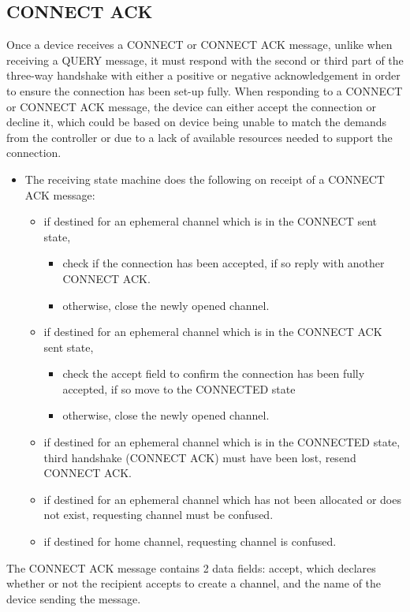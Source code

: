 \subsection{CONNECT ACK} %
\label{sub:connect_ack}
Once a device receives a CONNECT or CONNECT ACK message, unlike when receiving a QUERY message, it must respond with the second or third part of the three-way handshake with either a positive or negative acknowledgement in order to ensure the connection has been set-up fully. When responding to a CONNECT or CONNECT ACK message, the device can either accept the connection or decline it, which could be based on device being unable to match the demands from the controller or due to a lack of available resources needed to support the connection.

\begin{itemize}
	\item []The receiving state machine does the following on receipt of a CONNECT ACK message:
	\begin{itemize}
		\item if destined for an ephemeral channel which is in the CONNECT sent state,
		\begin{itemize}
		 	\item check if the connection has been accepted, if so reply with another CONNECT ACK.
		 	\item otherwise, close the newly opened channel.
		\end{itemize} 
		\item if destined for an ephemeral channel which is in the CONNECT ACK sent state,
		\begin{itemize}
		  	\item check the accept field to confirm the connection has been fully accepted, if so move to the CONNECTED state
		  	\item otherwise, close the newly opened channel.
		\end{itemize} 
		\item if destined for an ephemeral channel which is in the CONNECTED state, third handshake (CONNECT ACK) must have been lost, resend CONNECT ACK.
		\item if destined for an ephemeral channel which has not been allocated or does not exist, requesting channel must be confused.
		\item if destined for home channel, requesting channel is confused.
	\end{itemize}
\end{itemize}
The CONNECT ACK message contains 2 data fields: accept, which declares whether or not the recipient accepts to create a channel, and the name of the device sending the message.

